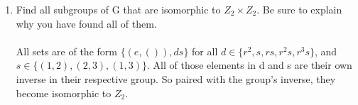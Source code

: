 \begin{enumerate}
\begin{enumerate}
        \item Find all subgroups of G that are isomorphic to $Z_2 \times Z_2$. Be sure to explain why you have found all of them.\\\\

        All sets are of the form $\{(e,()), ds\}$ for all $d \in \{r^2, s, rs, r^2s, r^3s\}$, and $s \in \{(1,2), (2,3), (1,3)\}$. All of those elements in d and s are their own inverse in their respective group. So paired with the group's inverse, they become isomorphic to $Z_2$. 
        \end{enumerate}
\end{enumerate}


